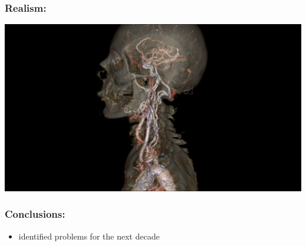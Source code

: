 \documentclass{beamer}
\begin{document}
\begin{frame}
	\frametitle{Realism:}
	\includegraphics[width=\textwidth]{images/realistic_transparent}
\end{frame}

\begin{frame}
	\frametitle{Conclusions:}
	\begin{itemize}
		\item identified problems for the next decade
	\end{itemize}
\end{frame}
\end{document}
